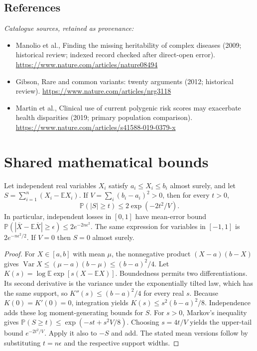 \documentclass[11pt]{article}
\begin{document}
\subsection{References}
\noindent\emph{Catalogue sources, retained as provenance:}
\begin{itemize}
\item Manolio et al., Finding the missing heritability of complex diseases (2009; historical review; indexed record checked after direct-open error). \url{https://www.nature.com/articles/nature08494}
\item Gibson, Rare and common variants: twenty arguments (2012; historical review). \url{https://www.nature.com/articles/nrg3118}
\item Martin et al., Clinical use of current polygenic risk scores may exacerbate health disparities (2019; primary population comparison). \url{https://www.nature.com/articles/s41588-019-0379-x}
\end{itemize}




\section{Shared mathematical bounds}\label{app:bounds}
\begin{lemma}\label{lem:bounded}
Let independent real variables $X_i$ satisfy $a_i\leq X_i\leq b_i$ almost surely,
and let $S=\sum_{i=1}^n(X_i-\mathbb{E} X_i)$. If
$V=\sum_i(b_i-a_i)^2>0$, then for every $t>0$,
\[
 \mathbb{P}(|S|\geq t)\leq 2\exp(-2t^2/V).
\]
In particular, independent losses in $[0,1]$ have mean-error bound
$\mathbb{P}(|\overline X-\mathbb{E}\overline X|\geq\epsilon)
\leq2e^{-2n\epsilon^2}$. The same expression for variables in $[-1,1]$
is $2e^{-n\epsilon^2/2}$. If $V=0$ then $S=0$ almost surely.
\end{lemma}
\begin{proof}
For $X\in[a,b]$ with mean $\mu$, the nonnegative product
$(X-a)(b-X)$ gives
$\operatorname{Var} X\leq(\mu-a)(b-\mu)\leq(b-a)^2/4$.
Let $K(s)=\log\mathbb{E}\exp[s(X-\mathbb{E} X)]$.
Boundedness permits two differentiations. Its second derivative is the variance
under the exponentially tilted law, which has the same support, so
$K''(s)\leq(b-a)^2/4$ for every real $s$.
Because $K(0)=K'(0)=0$, integration yields
$K(s)\leq s^2(b-a)^2/8$.
Independence adds these log moment-generating bounds for $S$.
For $s>0$, Markov's inequality gives
$\mathbb{P}(S\geq t)\leq\exp(-st+s^2V/8)$.
Choosing $s=4t/V$ yields the upper-tail bound $e^{-2t^2/V}$.
Apply it also to $-S$ and add. The stated mean versions follow by substituting
$t=n\epsilon$ and the respective support widths.
\end{proof}
\end{document}
